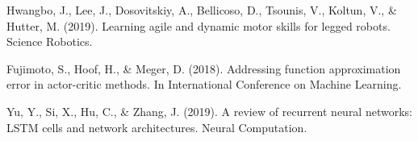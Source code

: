\documentclass[12pt]{article}
\begin{document}
\begin{thebibliography}{10}
Hwangbo, J., Lee, J., Dosovitskiy, A., Bellicoso, D., Tsounis, V., Koltun, V., \& Hutter, M. (2019). Learning agile and dynamic motor skills for legged robots. Science Robotics.

Fujimoto, S., Hoof, H., \& Meger, D. (2018). Addressing function approximation error in actor-critic methods. In International Conference on Machine Learning.

Yu, Y., Si, X., Hu, C., \& Zhang, J. (2019). A review of recurrent neural networks: LSTM cells and network architectures. Neural Computation.

\end{thebibliography}
\end{document}
